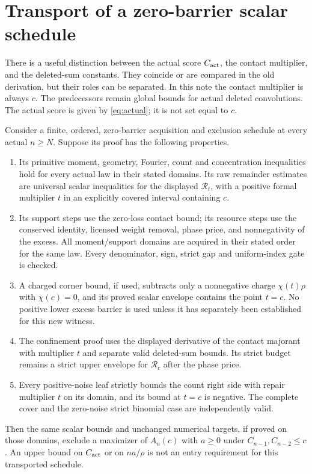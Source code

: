 \section{Transport of a zero-barrier scalar schedule}
There is a useful distinction between the actual score $C_{\rm act}$,
the contact multiplier, and the deleted-sum constants. They coincide or
are compared in the old derivation, but their roles can be separated.
In this note the contact multiplier is always $c$. The predecessors
remain global bounds for actual deleted convolutions. The actual score
is given by \eqref{eq:actual}; it is not set equal to $c$.

\begin{theorem}\label{thm:transport}
Consider a finite, ordered, zero-barrier acquisition and exclusion
schedule at every actual $n\ge N$. Suppose its proof has the following
properties.
\begin{enumerate}
\item Its primitive moment, geometry, Fourier, count and concentration
inequalities hold for every actual law in their stated domains. Its raw
remainder estimates are universal scalar inequalities for the displayed
$\mathcal R_t$, with a positive formal multiplier $t$ in an explicitly
covered interval containing $c$.
\item Its support steps use the zero-loss contact bound; its resource
steps use the conserved identity, licensed weight removal, phase price,
and nonnegativity of the excess. All moment/support domains are acquired
in their stated order for the same law. Every denominator, sign, strict
gap and uniform-index gate is checked.
\item A charged corner bound, if used, subtracts only a nonnegative
charge $\chi(t)\rho$ with $\chi(c)=0$, and its proved scalar envelope
contains the point $t=c$. No positive lower excess barrier is used unless
it has separately been established for this new witness.
\item The confinement proof uses the displayed derivative of the contact
majorant with multiplier $t$ and separate valid deleted-sum bounds. Its
strict budget remains a strict upper envelope for $\mathcal R_c$ after
the phase price.
\item Every positive-noise leaf strictly bounds the count right side
with repair multiplier $t$ on its domain, and its bound at $t=c$ is
negative. The complete cover and the zero-noise strict binomial case
are independently valid.
\end{enumerate}
Then the same scalar bounds and unchanged numerical targets, if proved
on those domains, exclude a maximizer of $A_n(c)$ with $a\ge0$ under
$C_{n-1},C_{n-2}\le c$. An upper bound on $C_{\rm act}$ or on $na/\rho$
is not an entry requirement for this transported schedule.
\end{theorem}
